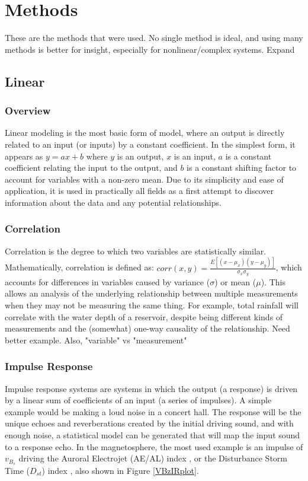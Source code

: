 \chapter[Models]{Methods}

These are the methods that were used.  No single method is ideal, and using many methods is better for insight, especially for nonlinear/complex systems.
\note Expand

\section{Linear}

\subsection{Overview}
Linear modeling is the most basic form of model, where an output is directly related to an input (or inputs) by a constant coefficient. In the simplest form, it appears as $y=ax+b$ where $y$ is an output, $x$ is an input, $a$ is a constant coefficient relating the input to the output, and $b$ is a constant shifting factor to account for variables with a non-zero mean.  Due to its simplicity and ease of application, it is used in practically all fields as a first attempt to discover information about the data and any potential relationships. 

\subsection{Correlation}
Correlation is the degree to which two variables are statistically similar. Mathematically, correlation is defined as: $corr(x,y)=\frac{E[(x-\mu_x)(y-\mu_y)]}{\sigma_x\sigma_y}$, which accounts for differences in variables caused by variance ($\sigma$) or mean ($\mu$). This allows an analysis of the underlying relationship between multiple measurements when they may not be measuring the same thing. For example, total rainfall will correlate with the water depth of a reservoir, despite being different kinds of measurements and the (somewhat) one-way causality of the relationship. 
\note Need better example. Also, "variable" vs "measurement"

\subsection{Impulse Response}

Impulse response systems are systems in which the output (a response) is driven by a linear sum of coefficients of an input (a series of impulses). A simple example would be making a loud noise in a concert hall. The response will be the unique echoes and reverberations created by the initial driving sound, and with enough noise, a statistical model can be generated that will map the input sound to a response echo. In the magnetosphere, the most used example is an impulse of $v_{B_s}$ driving the Auroral Electrojet (AE/AL) index \cite{VBzAL}, or the Disturbance Storm Time ($D_{st}$)  index \cite{VBzDST}, also shown in Figure \ref{VBzIRplot}.

